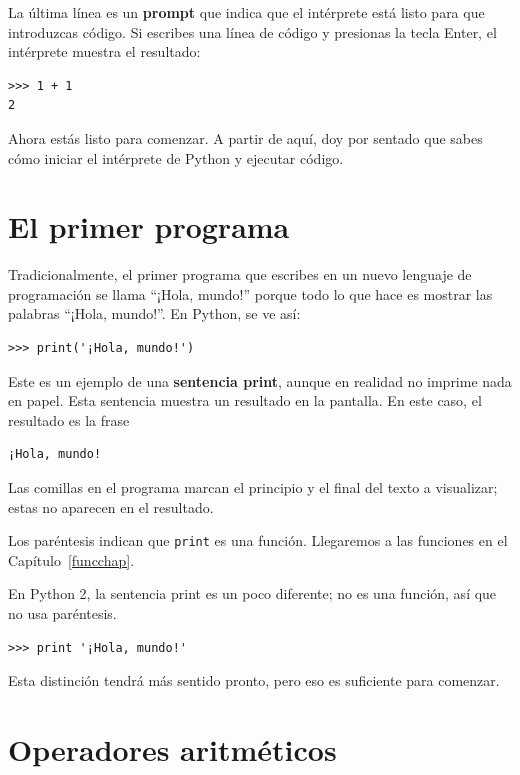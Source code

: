 \documentclass[10pt]{book}
\begin{document}
La última línea es un {\bf prompt} que indica que el intérprete está listo
para que introduzcas código.
Si escribes una línea de código y presionas la tecla Enter, el intérprete
muestra el resultado:

\begin{verbatim}
>>> 1 + 1
2
\end{verbatim}
%
Ahora estás listo para comenzar.
A partir de aquí, doy por sentado que sabes cómo iniciar el intérprete de Python
y ejecutar código.


\section{El primer programa}
\label{hello}

Tradicionalmente, el primer programa que escribes en un nuevo lenguaje
de programación se llama ``¡Hola, mundo!'' porque todo lo que hace es mostrar
las palabras ``¡Hola, mundo!''.  En Python, se ve así:

\begin{verbatim}
>>> print('¡Hola, mundo!')
\end{verbatim}
%
Este es un ejemplo de una {\bf sentencia print}, aunque
en realidad no imprime nada en papel.  Esta sentencia muestra un resultado en la
pantalla.  En este caso, el resultado es la frase

\begin{verbatim}
¡Hola, mundo!
\end{verbatim}
%
Las comillas en el programa marcan el principio y el final
del texto a visualizar; estas no aparecen en el resultado.

Los paréntesis indican que {\tt print} es una función.  Llegaremos
a las funciones en el Capítulo~\ref{funcchap}.
 

En Python 2, la sentencia print es un poco diferente; no es
una función, así que no usa paréntesis.

\begin{verbatim}
>>> print '¡Hola, mundo!'
\end{verbatim}
%
Esta distinción tendrá más sentido pronto, pero eso es suficiente para
comenzar.


\section{Operadores aritméticos}
\end{document}

